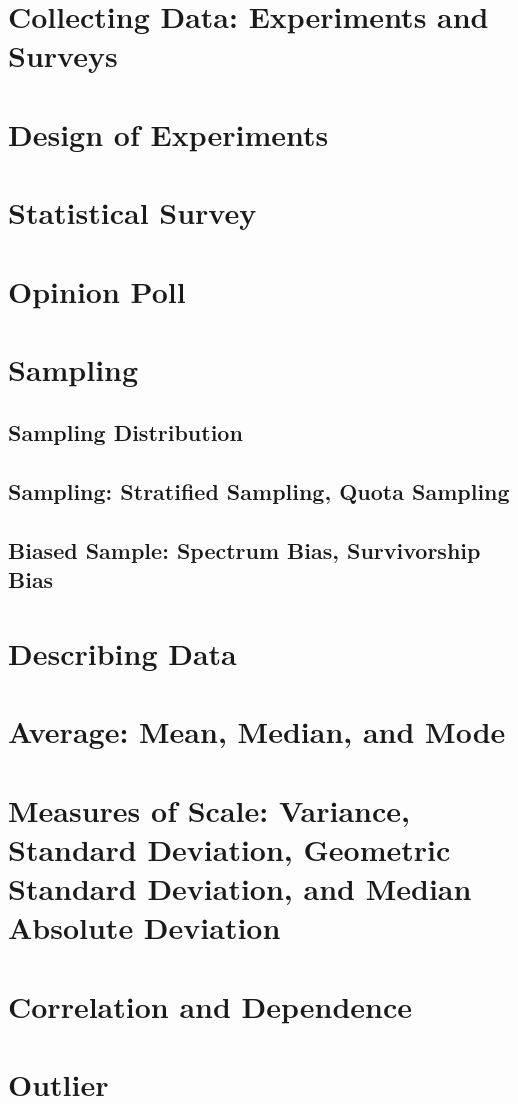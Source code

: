 \section{Collecting Data: Experiments and Surveys}
\section{Design of Experiments}
\section{Statistical Survey}
\section{Opinion Poll}

\section{Sampling}
\subsection{Sampling Distribution}
\subsection{Sampling: Stratified Sampling, Quota Sampling}
\subsection{Biased Sample: Spectrum Bias, Survivorship Bias}

\section{Describing Data}
\section{Average: Mean, Median, and Mode}
\section{Measures of Scale: Variance, Standard Deviation, Geometric Standard Deviation, and Median Absolute Deviation}
\section{Correlation and Dependence}
\section{Outlier}
